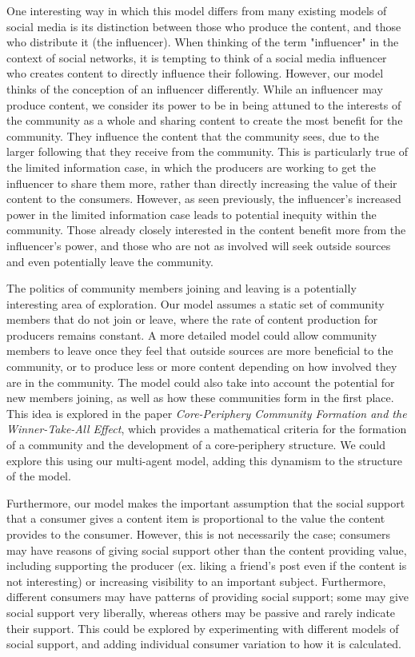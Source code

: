 \documentclass[11pt, letterpaper]{article}
\begin{document}
One interesting way in which this model differs from many existing models of social media is its distinction between those who produce the content, and those who distribute it (the influencer). When thinking of the term "influencer" in the context of social networks, it is tempting to think of a social media influencer who creates content to directly influence their following. However, our model thinks of the conception of an influencer differently. While an influencer may produce content, we consider its power to be in being attuned to the interests of the community as a whole and sharing content to create the most benefit for the community. They influence the content that the community sees, due to the larger following that they receive from the community. This is particularly true of the limited information case, in which the producers are working to get the influencer to share them more, rather than directly increasing the value of their content to the consumers. However, as seen previously, the influencer's increased power in the limited information case leads to potential inequity within the community. Those already closely interested in the content benefit more from the influencer's power, and those who are not as involved will seek outside sources and even potentially leave the community. 

The politics of community members joining and leaving is a potentially interesting area of exploration. Our model assumes a static set of community members that do not join or leave, where the rate of content production for producers remains constant. A more detailed model could allow community members to leave once they feel that outside sources are more beneficial to the community, or to produce less or more content depending on how involved they are in the community. The model could also take into account the potential for new members joining, as well as how these communities form in the first place. This idea is explored in the paper \textit{Core-Periphery Community Formation and the Winner-Take-All Effect}, which provides a mathematical criteria for the formation of a community and the development of a core-periphery structure. We could explore this using our multi-agent model, adding this dynamism to the structure of the model.

Furthermore, our model makes the important assumption that the social support that a consumer gives a content item is proportional to the value the content provides to the consumer. However, this is not necessarily the case; consumers may have reasons of giving social support other than the content providing value, including supporting the producer (ex. liking a friend's post even if the content is not interesting) or increasing visibility to an important subject. Furthermore, different consumers may have patterns of providing social support; some may give social support very liberally, whereas others may be passive and rarely indicate their support. This could be explored by experimenting with different models of social support, and adding individual consumer variation to how it is calculated.
\end{document}
